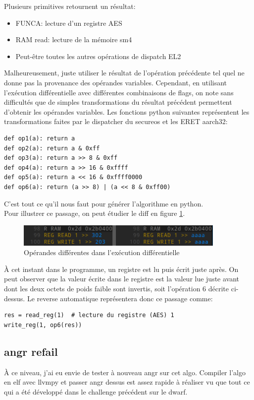 \documentclass[14pt]{article}
\theoremstyle{definition}
\begin{document}
Plusieurs primitives retournent un résultat:
\begin{itemize}
  \item FUNCA: lecture d'un registre AES
  \item RAM read: lecture de la mémoire sm4
  \item Peut-être toutes les autres opérations de dispatch EL2
\end{itemize}
Malheureusement, juste utiliser le résultat de l'opération précédente tel quel ne donne pas la provenance des opérandes variables. 
Cependant, en utilisant l'exécution différentielle avec différentes combinaisons de flags, on note sans difficultés que de simples transformations du résultat précédent permettent d'obtenir les opérandes variables.
Les fonctions python suivantes représentent les transformations faites par le dispatcher du secureos et les ERET aarch32:
\begin{verbatim}
def op1(a): return a
def op2(a): return a & 0xff
def op3(a): return a >> 8 & 0xff
def op4(a): return a >> 16 & 0xffff
def op5(a): return a << 16 & 0xffff0000
def op6(a): return (a >> 8) | (a << 8 & 0xff00)
\end{verbatim}

C'est tout ce qu'il nous faut pour générer l'algorithme en python. \\ 


Pour illustrer ce passage, on peut étudier le diff en figure \ref{fig:p3_diff_constvars}.
\begin{figure}[H]
\centering
\includegraphics[width=0.9\textwidth]{./screenshots/p3_diff_constant_var.png}
  \caption{Opérandes différentes dans l'exécution différentielle}
  \label{fig:p3_diff_constvars}
\end{figure}
À cet instant dans le programme, un registre est lu puis écrit juste après.
On peut observer que la valeur écrite dans le registre est la valeur lue juste avant dont les deux octets de poids faible sont invertis, soit l'opération 6 décrite ci-dessus.
Le reverse automatique représentera donc ce passage comme:
\begin{verbatim}
res = read_reg(1)  # lecture du registre (AES) 1
write_reg(1, op6(res))
\end{verbatim}



\subsection{\:angr refail}
À ce niveau, j'ai eu envie de tester à nouveau angr sur cet algo.
Compiler l'algo en elf avec llvmpy et passer angr dessus est assez rapide à réaliser vu que tout ce qui a été développé dans le challenge précédent sur le dwarf.
\end{document}
